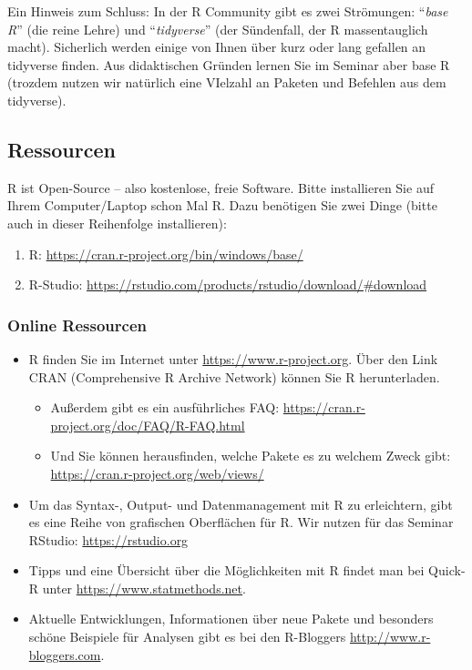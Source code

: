 \documentclass[
]{article}
\providecommand{\tightlist}{%
  \setlength{\itemsep}{0pt}\setlength{\parskip}{0pt}}
\begin{document}
Ein Hinweis zum Schluss: In der R Community gibt es zwei Strömungen:
``\emph{base R}'' (die reine Lehre) und ``\emph{tidyverse}'' (der
Sündenfall, der R massentauglich macht). Sicherlich werden einige von
Ihnen über kurz oder lang gefallen an tidyverse finden. Aus didaktischen
Gründen lernen Sie im Seminar aber base R (trozdem nutzen wir natürlich
eine VIelzahl an Paketen und Befehlen aus dem tidyverse).

\hypertarget{ressourcen}{%
\subsection{Ressourcen}\label{ressourcen}}

R ist Open-Source -- also kostenlose, freie Software. Bitte installieren
Sie auf Ihrem Computer/Laptop schon Mal R. Dazu benötigen Sie zwei Dinge
(bitte auch in dieser Reihenfolge installieren):

\begin{enumerate}
\def\labelenumi{\arabic{enumi}.}
\tightlist
\item
  R: \url{https://cran.r-project.org/bin/windows/base/}
\item
  R-Studio:
  \url{https://rstudio.com/products/rstudio/download/\#download}
\end{enumerate}

\hypertarget{online-ressourcen}{%
\subsubsection{Online Ressourcen}\label{online-ressourcen}}

\begin{itemize}
\tightlist
\item
  R finden Sie im Internet unter \url{https://www.r-project.org}. Über
  den Link CRAN (Comprehensive R Archive Network) können Sie R
  herunterladen.

  \begin{itemize}
  \tightlist
  \item
    Außerdem gibt es ein ausführliches FAQ:
    \url{https://cran.r-project.org/doc/FAQ/R-FAQ.html}
  \item
    Und Sie können herausfinden, welche Pakete es zu welchem Zweck gibt:
    \url{https://cran.r-project.org/web/views/}
  \end{itemize}
\item
  Um das Syntax-, Output- und Datenmanagement mit R zu erleichtern, gibt
  es eine Reihe von grafischen Oberflächen für R. Wir nutzen für das
  Seminar RStudio: \url{https://rstudio.org}
\item
  Tipps und eine Übersicht über die Möglichkeiten mit R findet man bei
  Quick-R unter \url{https://www.statmethods.net}.
\item
  Aktuelle Entwicklungen, Informationen über neue Pakete und besonders
  schöne Beispiele für Analysen gibt es bei den R-Bloggers
  \url{http://www.r-bloggers.com}.
\end{itemize}
\end{document}
